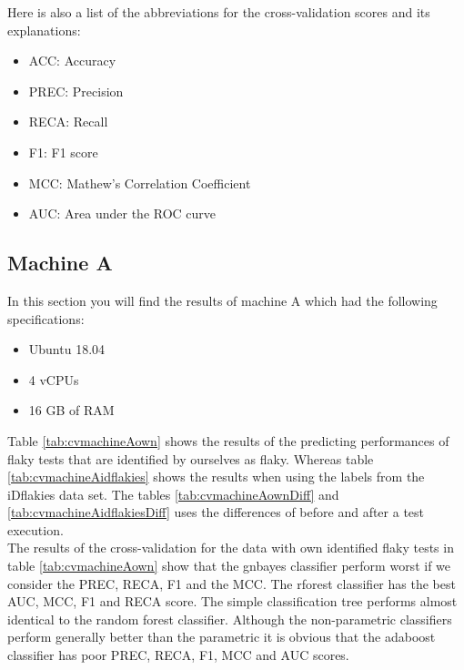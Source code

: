 \documentclass{seal_thesis}
\begin{document}
Here is also a list of the abbreviations for the cross-validation scores and its explanations:
\begin{itemize}
\item ACC: Accuracy
\item PREC: Precision
\item RECA: Recall
\item F1: F1 score
\item MCC: Mathew's Correlation Coefficient
\item AUC: Area under the ROC curve
\end{itemize}



\subsection{Machine A}
In this section you will find the results of machine A which had the following specifications:

\begin{itemize}
\item Ubuntu 18.04
\item 4 vCPUs
\item 16 GB of RAM
\end{itemize}

\noindent Table \ref{tab:cvmachineAown} shows the results of the predicting performances of flaky tests that are identified by ourselves as flaky. Whereas table \ref{tab:cvmachineAidflakies} shows the results when using the labels from the iDflakies data set. The tables \ref{tab:cvmachineAownDiff} and \ref{tab:cvmachineAidflakiesDiff} uses the differences of before and after a test execution.\\

\noindent The results of the cross-validation for the data with own identified flaky tests in table \ref{tab:cvmachineAown} show that the gnbayes classifier perform worst if we consider the PREC, RECA, F1 and the MCC. The rforest classifier has the best AUC, MCC, F1 and RECA score. The simple classification tree performs almost identical to the random forest classifier. Although the non-parametric classifiers perform generally better than the parametric it is obvious that the adaboost classifier has poor PREC, RECA, F1, MCC and AUC scores.\\
\end{document}
